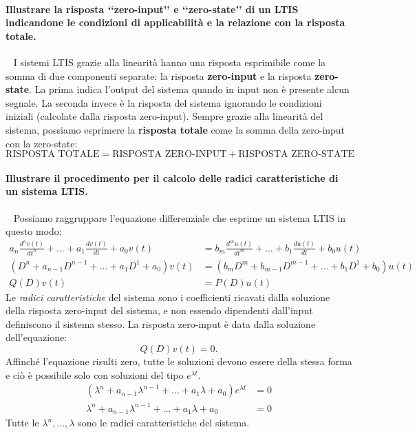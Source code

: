\documentclass[a4paper,oneside]{scrbook}
\begin{document}
\paragraph{Illustrare la risposta ‘‘zero-input’’ e ‘‘zero-state’’ di un LTIS indicandone le condizioni di applicabilità e la relazione con la risposta totale.}\
\newline
I sistemi LTIS grazie alla linearità hanno una risposta esprimibile come la somma di due componenti separate: la risposta \textbf{zero-input} e la risposta \textbf{zero-state}.
La prima indica l'output del sistema quando in input non è presente alcun segnale.
La seconda invece è la risposta del sistema ignorando le condizioni iniziali (calcolate dalla risposta zero-input).
Sempre grazie alla linearità del sistema, possiamo esprimere la \textbf{risposta totale} come la somma della zero-input con la zero-state:
\begin{equation*}
	\text{RISPOSTA TOTALE} = \text{RISPOSTA ZERO-INPUT} + \text{RISPOSTA ZERO-STATE}
\end{equation*}

\paragraph{Illustrare il procedimento per il calcolo delle radici caratteristiche di un sistema LTIS.}\
\newline
Possiamo raggruppare l'equazione differenziale che esprime un sistema LTIS in questo modo:
\begin{align*}
a_n\frac{d^nv(t)}{dt^n} + \ldots + a_1\frac{dv(t)}{dt} + a_0v(t) &= b_m\frac{d^mu(t)}{dt^m} + \ldots + b_1\frac{du(t)}{dt} + b_0u(t)\\
(D^n+a_{n-1}D^{n-1}+\ldots+a_1D^1+a_0)v(t)&=(b_mD^m+b_{m-1}D^{m-1}+\ldots+b_1D^1+b_0)u(t)\\
Q(D)v(t)&=P(D)u(t)
\end{align*}
Le \textit{radici caratteristiche} del sistema sono i coefficienti ricavati dalla soluzione della risposta zero-input del sistema, e non essendo dipendenti dall'input
definiscono il sistema stesso. La risposta zero-input è data dalla soluzione dell'equazione:
\begin{equation*}
	Q(D)v(t)=0.
\end{equation*}
Affinché l'equazione risulti zero, tutte le soluzioni devono essere della stessa forma e ciò è possibile solo con soluzioni del tipo $e^{\lambda t}$.
\begin{align*}
	(\lambda^n+a_{n-1}\lambda^{n-1}+\ldots+a_1\lambda+a_0)e^{\lambda t}&=0\\
	\lambda^n+a_{n-1}\lambda^{n-1}+\ldots+a_1\lambda+a_0&=0
\end{align*}
Tutte le $\lambda^n,\ldots,\lambda$ sono le radici caratteristiche del sistema.
\end{document}
